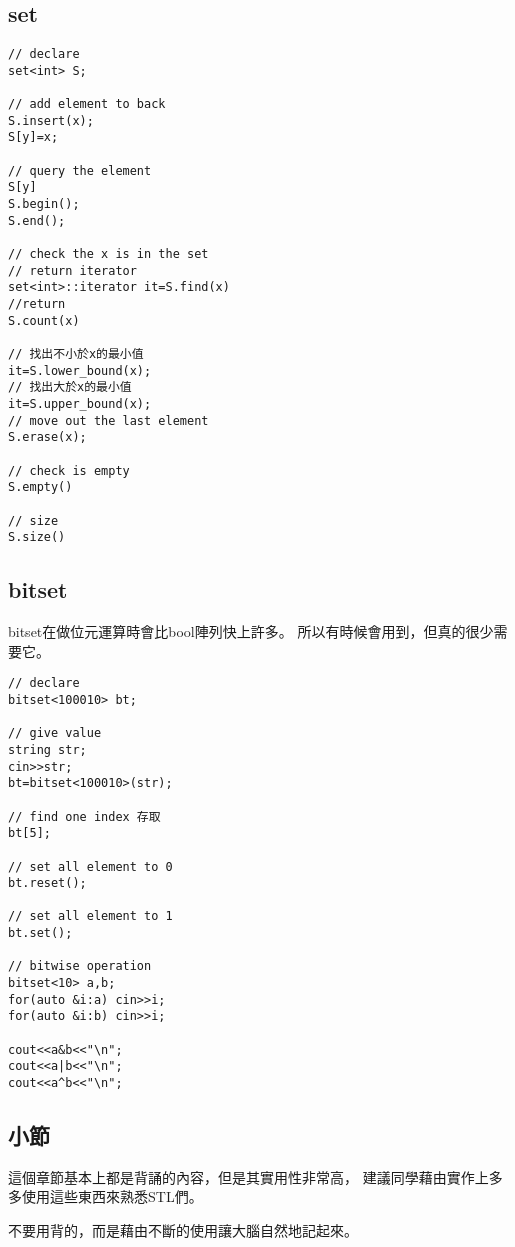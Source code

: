     \subsection{set}

\begin{lstlisting}[caption=set 用法]
// declare
set<int> S;

// add element to back
S.insert(x);
S[y]=x;

// query the element
S[y]
S.begin();
S.end();

// check the x is in the set
// return iterator
set<int>::iterator it=S.find(x)
//return
S.count(x)

// 找出不小於x的最小值
it=S.lower_bound(x);
// 找出大於x的最小值
it=S.upper_bound(x);
// move out the last element
S.erase(x);

// check is empty
S.empty()
    
// size
S.size()
\end{lstlisting}

    \subsection{bitset}
    bitset在做位元運算時會比bool陣列快上許多。
    所以有時候會用到，但真的很少需要它。

\begin{lstlisting}[caption=bitset 用法]
// declare
bitset<100010> bt;

// give value
string str;
cin>>str;
bt=bitset<100010>(str);

// find one index 存取
bt[5];

// set all element to 0
bt.reset();

// set all element to 1
bt.set();

// bitwise operation
bitset<10> a,b;
for(auto &i:a) cin>>i;
for(auto &i:b) cin>>i;

cout<<a&b<<"\n";
cout<<a|b<<"\n";
cout<<a^b<<"\n";
\end{lstlisting}

    \subsection{小節}
    這個章節基本上都是背誦的內容，但是其實用性非常高，
    建議同學藉由實作上多多使用這些東西來熟悉STL們。

    \begin{tip}
        不要用背的，而是藉由不斷的使用讓大腦自然地記起來。
    \end{tip}

